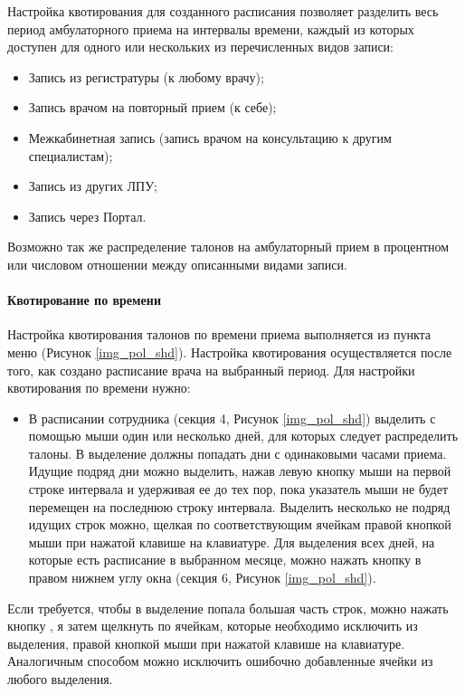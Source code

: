 Настройка квотирования для созданного расписания позволяет разделить весь период амбулаторного приема на интервалы времени, каждый из которых доступен для одного или нескольких из перечисленных видов записи:
\begin{itemize}
 \item Запись из регистратуры (к любому врачу);
 \item Запись врачом на повторный прием (к себе);
 \item Межкабинетная запись (запись врачом на консультацию к другим специалистам);
 \item Запись из других ЛПУ;
 \item Запись через Портал. 
\end{itemize}
 
Возможно так же распределение талонов на амбулаторный прием в процентном или числовом отношении между описанными видами записи.

\paragraph{Квотирование по времени}

Настройка квотирования талонов по времени приема выполняется из пункта меню  (Рисунок \ref{img_pol_shd}). Настройка квотирования осуществляется после того, как создано расписание врача на выбранный период. Для настройки квотирования по времени нужно:
\begin{itemize}
 \item В расписании сотрудника (секция 4, Рисунок \ref{img_pol_shd}) выделить с помощью мыши один или несколько дней, для которых следует распределить талоны. В выделение должны попадать дни с одинаковыми часами приема. Идущие подряд дни можно выделить, нажав левую кнопку мыши на первой строке интервала и удерживая ее до тех пор, пока указатель мыши не будет перемещен на последнюю строку интервала. Выделить несколько не подряд идущих строк можно, щелкая по соответствующим ячейкам правой кнопкой мыши при нажатой клавише  на клавиатуре. Для выделения всех дней, на которые есть расписание в выбранном месяце, можно нажать кнопку   в правом нижнем углу окна (секция 6, Рисунок \ref{img_pol_shd}).
\end{itemize}

\begin{prim}
 Если требуется, чтобы в выделение попала большая часть строк, можно нажать кнопку , я затем щелкнуть по ячейкам, которые необходимо исключить из выделения, правой кнопкой мыши при нажатой клавише  на клавиатуре. Аналогичным способом можно исключить ошибочно добавленные ячейки из любого выделения.
\end{prim}

